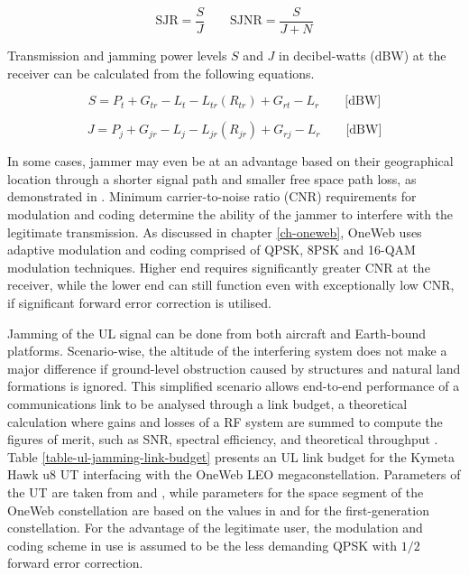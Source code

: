 \documentclass[english, 12pt, a4paper, elec, utf8, a-1b, online]{aaltothesis}
\begin{document}
\begin{equation*}
  \text{SJR} = \frac{S}{J} \qquad
  \text{SJNR} = \frac{S}{J+N}
\end{equation*}

Transmission and jamming power levels $S$ and $J$ in decibel-watts (dBW) at the receiver can be calculated from the following equations.

\begin{equation} \label{eq-signal-power-full}
  S = P_t + G_{tr}-L_t-L_{tr}(R_{tr})+G_{rt}-L_r \qquad \text{[dBW]}
\end{equation}

\begin{equation}
  J = P_j + G_{jr}-L_j-L_{jr}(R_{jr})+G_{rj}-L_r \qquad \text{[dBW]}
\end{equation}

In some cases, jammer may even be at an advantage based on their geographical location through a shorter signal path and smaller free space path loss, as demonstrated in \cite{pavur2022defcon}.
Minimum carrier-to-noise ratio (CNR) requirements for modulation and coding determine the ability of the jammer to interfere with the legitimate transmission.
As discussed in chapter \ref{ch-oneweb}, OneWeb uses adaptive modulation and coding comprised of QPSK, 8PSK and 16-QAM modulation techniques. Higher end requires significantly greater CNR at the receiver, while the lower end can still function even with exceptionally low CNR, if significant forward error correction is utilised. \cite{allen2022terrestrial,etsi2012en302307}

Jamming of the UL signal can be done from both aircraft and Earth-bound platforms.
Scenario-wise, the altitude of the interfering system does not make a major difference if ground-level obstruction caused by structures and natural land formations is ignored.
This simplified scenario allows end-to-end performance of a communications link to be analysed through a link budget, a theoretical calculation where gains and losses of a RF system are summed to compute the figures of merit, such as SNR, spectral efficiency, and theoretical throughput \cite{kymeta2019link}.
Table \ref{table-ul-jamming-link-budget} presents an UL link budget for the Kymeta Hawk u8 UT interfacing with the OneWeb LEO megaconstellation.
Parameters of the UT are taken from \cite{kymeta2022hawk} and \cite{kymeta2020mod}, while parameters for the space segment of the OneWeb constellation are based on the values in \cite{worldvu2016loi} and \cite{allen2022terrestrial} for the first-generation constellation.
For the advantage of the legitimate user, the modulation and coding scheme in use is assumed to be the less demanding QPSK with $1/2$ forward error correction.
\end{document}
